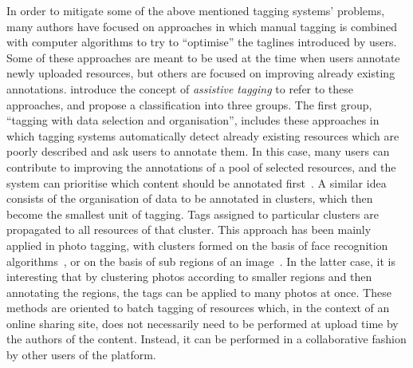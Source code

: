 In order to mitigate some of the above mentioned tagging systems' problems, many authors have focused on approaches in which manual tagging is combined with computer algorithms to try to ``optimise'' the taglines introduced by users. Some of these approaches are meant to be used at the time when users annotate newly uploaded resources, but others are focused on improving already existing annotations.
\cite{Wang2012} introduce the concept of \emph{assistive tagging} to refer to these approaches, and propose a classification into three groups. 
The first group, ``tagging with data selection and organisation'', includes these approaches in which tagging systems automatically detect already existing resources which are poorly described and ask users to annotate them. In this case, many users can contribute to improving the annotations of a pool of selected resources, and the system can prioritise which content should be annotated first~\citep{Huang2008,Wang2011a}. %
A similar idea consists of the organisation of data to be annotated in clusters, which then become the smallest unit of tagging. Tags assigned to particular clusters are propagated to all resources of that cluster. This approach has been mainly applied in photo tagging, with clusters formed on the basis of face recognition algorithms~\citep{Suh2004,Cui2007,Tian2007}, or on the basis of sub regions of an image~\citep{Tang2010}. In the latter case, it is interesting that by clustering photos according to smaller regions and then annotating the regions, the tags can be applied to many photos at once. 
These methods are oriented to batch tagging of resources which, in the context of an online sharing site, does not necessarily need to be performed at upload time by the authors of the content. Instead, it can be performed in a collaborative fashion by other users of the platform.

